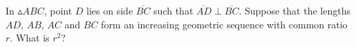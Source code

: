 In $\vartriangle ABC$, point $D$ lies on side $\overline{BC}$ such that $\overline{AD} \perp \overline{BC}$. Suppose that the lengths $AD$, $AB$, $AC$ and $BC$ form an increasing geometric sequence with common ratio $r$. What is $r^2$?
